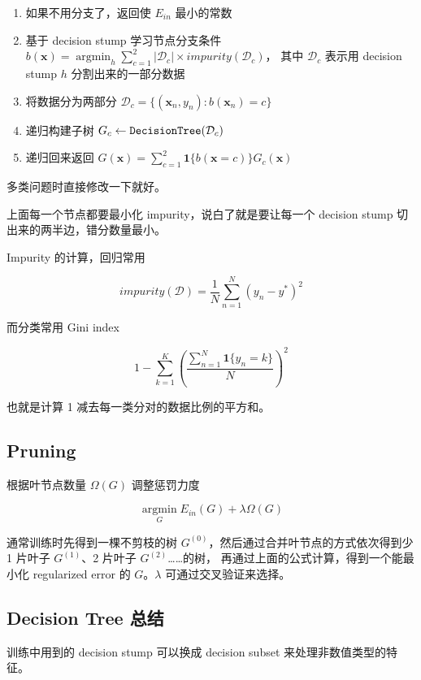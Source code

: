 \documentclass[a4paper]{article}
\begin{document}
\begin{enumerate}
  \item 如果不用分支了，返回使 $E_{in}$ 最小的常数 \\
  \item 基于 decision stump 学习节点分支条件 $\displaystyle b(\mathbf{x}) = \operatorname*{argmin}_{h}\sum_{c=1}^{2}|\mathcal{D}_c| \times impurity(\mathcal{D}_c)$，
  其中 $\mathcal{D}_c$ 表示用 decision stump $h$ 分割出来的一部分数据 \\
  \item 将数据分为两部分 $\mathcal{D}_c = \{(\mathbf{x}_n, y_n): b(\mathbf{x}_n) = c\}$ \\
  \item 递归构建子树 $G_c \leftarrow \text{\texttt{DecisionTree}}(\mathcal{D}_c)$ \\
  \item 递归回来返回 $\displaystyle G(\mathbf{x}) = \sum_{c=1}^{2}\mathbf{1}\{b(\mathbf{x} = c)\}G_c(\mathbf{x})$ \\
\end{enumerate}

多类问题时直接修改一下就好。

上面每一个节点都要最小化 impurity，说白了就是要让每一个 decision stump 切出来的两半边，错分数量最小。

Impurity 的计算，回归常用

$$impurity(\mathcal{D}) = \frac{1}{N}\sum_{n=1}^{N}(y_n - y^{*})^2$$

而分类常用 Gini index

$$1 - \sum_{k=1}^{K}\left ( \frac{\sum_{n=1}^{N}\mathbf{1}\{y_n = k\}}{N} \right )^2$$

也就是计算 1 减去每一类分对的数据比例的平方和。

\subsection{Pruning}
根据叶节点数量 $\Omega(G)$ 调整惩罚力度

$$\operatorname*{argmin}_{G}E_{in}(G) + \lambda\Omega(G)$$

通常训练时先得到一棵不剪枝的树 $G^{(0)}$，然后通过合并叶节点的方式依次得到少 1 片叶子 $G^{(1)}$、2 片叶子 $G^{(2)}$……的树，
再通过上面的公式计算，得到一个能最小化 regularized error 的 $G$。$\lambda$ 可通过交叉验证来选择。


\subsection{Decision Tree 总结}
训练中用到的 decision stump 可以换成 decision subset 来处理非数值类型的特征。
\end{document}
